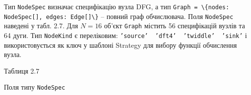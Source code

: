 \documentclass[
]{article}
\newcommand{\passthrough}[1]{#1}
\begin{document}
Тип \passthrough{\lstinline!NodeSpec!} визначає специфікацію вузла DFG,
а тип
\passthrough{\lstinline!Graph!}\passthrough{\lstinline! !}\passthrough{\lstinline!=!}\passthrough{\lstinline! !}\passthrough{\lstinline!\{!}\passthrough{\lstinline!nodes!}\passthrough{\lstinline!:!}\passthrough{\lstinline! !}\passthrough{\lstinline!NodeSpec!}\passthrough{\lstinline![],!}\passthrough{\lstinline! !}\passthrough{\lstinline!edges!}\passthrough{\lstinline!:!}\passthrough{\lstinline! !}\passthrough{\lstinline!Edge!}\passthrough{\lstinline![]\}!}
-- повний граф обчислювача. Поля \passthrough{\lstinline!NodeSpec!}
наведені у табл. 2.7. Для \(N = 16\) об'єкт
\passthrough{\lstinline!Graph!} містить 56 специфікацій вузлів та 64
дуги. Тип \passthrough{\lstinline!NodeKind!} є переліковим:
\passthrough{\lstinline!’!}\passthrough{\lstinline!source!}\passthrough{\lstinline!’!}\passthrough{\lstinline!  !}\passthrough{\lstinline!’!}\passthrough{\lstinline!dft!}\passthrough{\lstinline!4’!}\passthrough{\lstinline!  !}\passthrough{\lstinline!’!}\passthrough{\lstinline!twiddle!}\passthrough{\lstinline!’!}\passthrough{\lstinline!  !}\passthrough{\lstinline!’!}\passthrough{\lstinline!sink!}\passthrough{\lstinline!’!}
і використовується як ключ у шаблоні Strategy для вибору функції
обчислення вузла.

Таблиця 2.7

Поля типу \passthrough{\lstinline!NodeSpec!}
\end{document}
